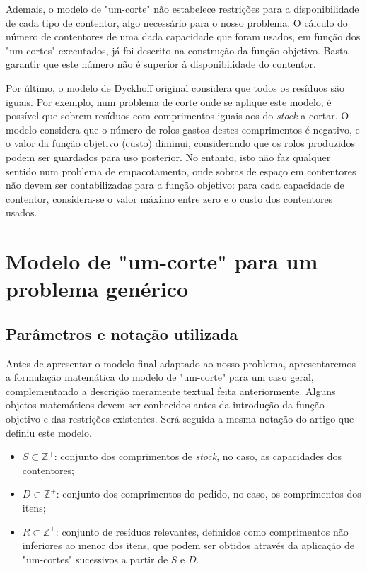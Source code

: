\documentclass[12pt, a4paper, titlepage]{article}
\begin{document}
Ademais, o modelo de "um-corte"{} não estabelece restrições para a disponibilidade de cada tipo de
contentor, algo necessário para o nosso problema. O cálculo do número de contentores de uma dada
capacidade que foram usados, em função dos "um-cortes"{} executados, já foi descrito na construção
da função objetivo. Basta garantir que este número não é superior à disponibilidade do contentor.

Por último, o modelo de Dyckhoff original considera que todos os resíduos são iguais. Por exemplo,
num problema de corte onde se aplique este modelo, é possível que sobrem resíduos com comprimentos
iguais aos do \emph{stock} a cortar. O modelo considera que o número de rolos gastos destes
comprimentos é negativo, e o valor da função objetivo (custo) diminui, considerando que os rolos
produzidos podem ser guardados para uso posterior. No entanto, isto não faz qualquer sentido num
problema de empacotamento, onde sobras de espaço em contentores não devem ser contabilizadas para a
função objetivo: para cada capacidade de contentor, considera-se o valor máximo entre zero e o custo
dos contentores usados.

\section{Modelo de "um-corte"{} para um problema genérico}

\subsection{Parâmetros e notação utilizada}

Antes de apresentar o modelo final adaptado ao nosso problema, apresentaremos a formulação
matemática do modelo de "um-corte"{} para um caso geral, complementando a descrição meramente
textual feita anteriormente. Alguns objetos matemáticos devem ser conhecidos antes da introdução da
função objetivo e das restrições existentes. Será seguida a mesma notação do artigo que definiu este
modelo. \cite{dyckhoff}

\begin{itemize}
    \item $S \subset \mathbb{\mathbb{Z}^+}$: conjunto dos comprimentos de \emph{stock}, no caso,
        as capacidades dos contentores;
    \item $D \subset \mathbb{\mathbb{Z}^+}$: conjunto dos comprimentos do pedido, no caso, os
        comprimentos dos
        itens;
    \item $R \subset \mathbb{\mathbb{Z}^+}$: conjunto de resíduos relevantes, definidos como
        comprimentos não inferiores ao menor dos itens, que podem ser obtidos através da aplicação
        de "um-cortes"{} sucessivos a partir de $S$ e $D$.
\end{itemize}
\end{document}
